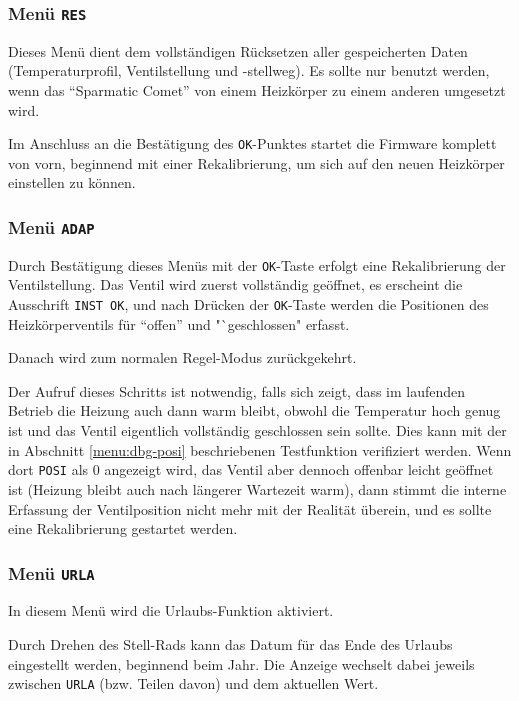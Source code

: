 \documentclass[a5paper,twoside]{article}
\newcommand\SC{"`Sparmatic Comet"'}
\begin{document}
\subsubsection {
  Menü \texttt{RES}\label{menu:res}
}

Dieses Menü dient dem vollständigen Rücksetzen aller gespeicherten
Daten (Temperaturprofil, Ventilstellung und -stellweg).  Es sollte nur
benutzt werden, wenn das \SC{} von einem Heizkörper zu einem anderen
umgesetzt wird.

Im Anschluss an die Bestätigung des \texttt{OK}-Punktes startet die
Firmware komplett von vorn, beginnend mit einer Rekalibrierung, um
sich auf den neuen Heizkörper einstellen zu können.

\subsubsection {
  Menü \texttt{ADAP}
}

Durch Bestätigung dieses Menüs mit der \texttt{OK}-Taste erfolgt
eine Rekalibrierung der Ventilstellung.  Das Ventil wird zuerst
vollständig geöffnet, es erscheint die Ausschrift \texttt{INST OK},
und nach Drücken der \texttt{OK}-Taste werden die Positionen des
Heizkörperventils für "`offen"' und "`geschlossen" erfasst.

Danach wird zum normalen Regel-Modus zurückgekehrt.

Der Aufruf dieses Schritts ist notwendig, falls sich zeigt, dass im
laufenden Betrieb die Heizung auch dann warm bleibt, obwohl die
Temperatur hoch genug ist und das Ventil eigentlich vollständig
geschlossen sein sollte.  Dies kann mit der in Abschnitt
\ref{menu:dbg-posi} beschriebenen Testfunktion verifiziert werden.
Wenn dort \texttt{POSI} als 0 angezeigt wird, das Ventil aber dennoch
offenbar leicht geöffnet ist (Heizung bleibt auch nach längerer
Wartezeit warm), dann stimmt die interne Erfassung der Ventilposition
nicht mehr mit der Realität überein, und es sollte eine Rekalibrierung
gestartet werden.

\subsubsection {
  Menü \texttt{URLA}
}

In diesem Menü wird die Urlaubs-Funktion aktiviert.

Durch Drehen des Stell-Rads kann das Datum für das Ende des Urlaubs
eingestellt werden, beginnend beim Jahr.  Die Anzeige wechselt dabei
jeweils zwischen \texttt{URLA} (bzw. Teilen davon) und dem aktuellen
Wert.
\end{document}
